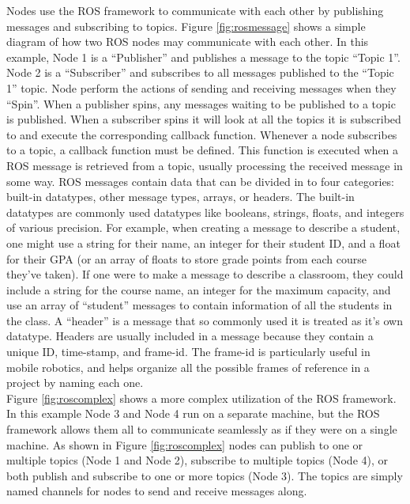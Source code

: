 Nodes use the ROS framework to communicate with each other by publishing messages and subscribing to topics. Figure \ref{fig:rosmessage} shows a simple diagram of how two ROS nodes may communicate with each other. In this example, Node 1 is a ``Publisher'' and publishes a message to the topic ``Topic 1''. Node 2 is a ``Subscriber'' and subscribes to all messages published to the ``Topic 1'' topic. Node perform the actions of sending and receiving messages when they ``Spin''. When a publisher spins, any messages waiting to be published to a topic is published. When a subscriber spins it will look at all the topics it is subscribed to and execute the corresponding callback function. Whenever a node subscribes to a topic, a callback function must be defined. This function is executed when a ROS message is retrieved from a topic, usually processing the received message in some way. ROS messages contain data that can be divided in to four categories: built-in datatypes, other message types, arrays, or headers. The built-in datatypes are commonly used datatypes like booleans, strings, floats, and integers of various precision. For example, when creating a message to describe a student, one might use a string for their name, an integer for their student ID, and a float for their GPA (or an array of floats to store grade points from each course they've taken). If one were to make a message to describe a classroom, they could include a string for the course name, an integer for the maximum capacity, and use an array of ``student'' messages to contain information of all the students in the class. A ``header'' is a message that so commonly used it is treated as it's own datatype. Headers are usually included in a message because they contain a unique ID, time-stamp, and frame-id. The frame-id is particularly useful in mobile robotics, and helps organize all the possible frames of reference in a project by naming each one.\\

Figure \ref{fig:roscomplex} shows a more complex utilization of the ROS framework. In this example Node 3 and Node 4 run on a separate machine, but the ROS framework allows them all to communicate seamlessly as if they were on a single machine. As shown in Figure \ref{fig:roscomplex} nodes can publish to one or multiple topics (Node 1 and Node 2), subscribe to multiple topics (Node 4), or both publish and subscribe to one or more topics (Node 3). The topics are simply named channels for nodes to send and receive messages along.\\

